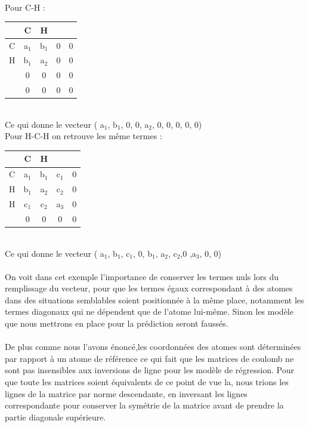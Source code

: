 \documentclass[a4paper,12pt,titlepage]{report}
\begin{document}
\paragraph{}
Pour C-H :
\begin{tabular}{ l | c c c c }
	 & C 	& H 	&   &		\\
	 \hline
   C & a$_1$ & b$_1$ &  0 & 0   \\
   H & b$_1$ & a$_2$ &	0 & 0	\\
    & 0 & 0 & 0 & 0	 \\
   & 0 & 0 & 0 & 0 \\
    \end{tabular} \\
Ce qui donne le vecteur ( a$_1$, b$_1$, 0, 0, a$_2$, 0, 0, 0, 0, 0) \\
Pour H-C-H on retrouve les même termes :
\begin{tabular}{ l | c c c c }
	 & C 	& H 	&   &		\\
	 \hline
   C & a$_1$ & b$_1$ &  c$_1$ & 0   \\
   H & b$_1$ & a$_2$ &	c$_2$ & 0	\\
   H & c$_1$ & c$_2$ &	a$_3$ & 0	\\
   & 0 & 0 & 0 & 0 \\
    \end{tabular} \\
 Ce qui donne le vecteur ( a$_1$, b$_1$, c$_1$, 0, b$_1$, a$_2$, c$_2$,0 ,a$_3$, 0, 0)
 \paragraph{}
On voit dans cet exemple l'importance de conserver les termes nuls lors du remplissage du vecteur, pour que les termes égaux correspondant à des atomes dans des situations semblables soient positionnée à la même place, notamment les termes diagonaux qui ne dépendent que de l'atome lui-même. Sinon les modèle que nous mettrons en place pour la prédiction seront faussés.

\paragraph{}
De plus comme nous l'avons énoncé,les coordonnées des atomes sont déterminées par rapport à un atome de référence ce qui fait que les matrices de coulomb ne sont pas insensibles aux inversions de ligne pour les modèle de régression. Pour que toute les matrices soient équivalents de ce point de vue la, nous trions les lignes de la matrice par norme descendante, en inversant les lignes correspondante pour conserver la symétrie de la matrice avant de prendre la partie diagonale supérieure.\\
\end{document}
